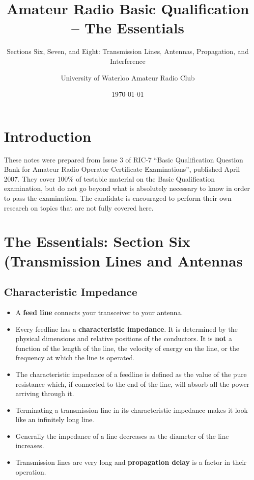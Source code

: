\documentclass[letterpaper,12pt]{scrartcl}
\title{Amateur Radio Basic Qualification -- The Essentials}
\subtitle{Sections Six, Seven, and Eight: Transmission Lines, Antennas, Propagation, and Interference}
\author{University of Waterloo Amateur Radio Club}
\date{\today}
\begin{document}
\maketitle
\tableofcontents

\section{Introduction}

These notes were prepared from Issue 3 of RIC-7 ``Basic Qualification Question Bank for Amateur Radio Operator Certificate Examinations'', published April 2007.
They cover 100\% of testable material on the Basic Qualification examination, but do not go beyond what is absolutely necessary to know in order to pass the examination.
The candidate is encouraged to perform their own research on topics that are not fully covered here.

\section{The Essentials: Section Six (Transmission Lines and Antennas}

\subsection{Characteristic Impedance}

\begin{itemize}
\item A \textbf{feed line} connects your transceiver to your antenna.
\item Every feedline has a \textbf{characteristic impedance}. It is determined by the physical dimensions
and relative positions of the conductors. It is \textbf{not} a function of the length of the line,
the velocity of energy on the line,
or the frequency at which the line is operated.
\item The characteristic impedance of a feedline is defined as the value of the pure resistance which, if connected to the end of the line,
will absorb all the power arriving through it.
\item Terminating a transmission line in its characteristic impedance makes it look like an infinitely long line. 
\item Generally the impedance of a line decreases as the diameter of the line increases.
\item Transmission lines are very long and \textbf{propagation delay} is a factor in their operation.
\end{itemize}
\end{document}
